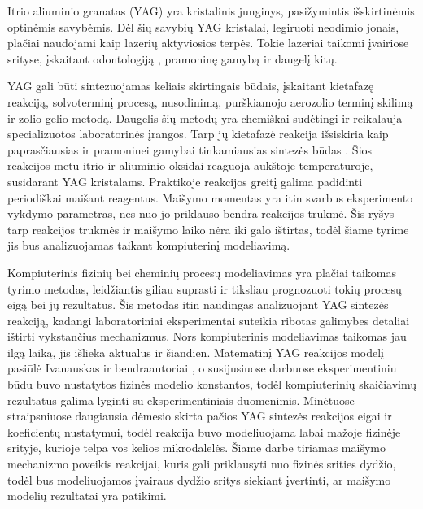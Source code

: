 
Itrio aliuminio granatas (YAG) yra kristalinis junginys, pasižymintis išskirtinėmis optinėmis savybėmis. Dėl šių savybių YAG kristalai, legiruoti neodimio jonais, plačiai naudojami kaip lazerių aktyviosios terpės. Tokie lazeriai taikomi įvairiose srityse, įskaitant odontologiją \cite{valentiUseErYAG2021}, pramoninę gamybą \cite{dubeyExperimentalStudyNd2008} ir daugelį kitų.

YAG gali būti sintezuojamas keliais skirtingais būdais, įskaitant kietafazę reakciją, solvoterminį procesą, nusodinimą, purškiamojo aerozolio terminį skilimą ir zolio-gelio metodą. Daugelis šių metodų yra chemiškai sudėtingi ir reikalauja specializuotos laboratorinės įrangos. Tarp jų kietafazė reakcija išsiskiria kaip paprasčiausias ir pramoninei gamybai tinkamiausias sintezės būdas \cite{zhangNovelSynthesisYAG2005}. Šios reakcijos metu itrio ir aliuminio oksidai reaguoja aukštoje temperatūroje, susidarant YAG kristalams. Praktikoje reakcijos greitį galima padidinti periodiškai maišant reagentus. Maišymo momentas yra itin svarbus eksperimento vykdymo parametras, nes nuo jo priklauso bendra reakcijos trukmė. Šis ryšys tarp reakcijos trukmės ir maišymo laiko nėra iki galo ištirtas, todėl šiame tyrime jis bus analizuojamas taikant kompiuterinį modeliavimą.

Kompiuterinis fizinių bei cheminių procesų modeliavimas yra plačiai taikomas tyrimo metodas, leidžiantis giliau suprasti ir tiksliau prognozuoti tokių procesų eigą bei jų rezultatus. Šis metodas itin naudingas analizuojant YAG sintezės reakciją, kadangi laboratoriniai eksperimentai suteikia ribotas galimybes detaliai ištirti vykstančius mechanizmus. Nors kompiuterinis modeliavimas taikomas jau ilgą laiką, jis išlieka aktualus ir šiandien. Matematinį YAG reakcijos modelį pasiūlė Ivanauskas ir bendraautoriai \cite{ivanauskasModellingSolidState2005}, o susijusiuose darbuose \cite{ivanauskasComputationalModellingYAG2009,mackeviciusCloserLookComputer2012} eksperimentiniu būdu buvo nustatytos fizinės modelio konstantos, todėl kompiuterinių skaičiavimų rezultatus galima lyginti su eksperimentiniais duomenimis. Minėtuose straipsniuose daugiausia dėmesio skirta pačios YAG sintezės reakcijos eigai ir koeficientų nustatymui, todėl reakcija buvo modeliuojama labai mažoje fizinėje srityje, kurioje telpa vos kelios mikrodalelės. Šiame darbe tiriamas maišymo mechanizmo poveikis reakcijai, kuris gali priklausyti nuo fizinės srities dydžio, todėl bus modeliuojamos įvairaus dydžio sritys siekiant įvertinti, ar maišymo modelių rezultatai yra patikimi.


